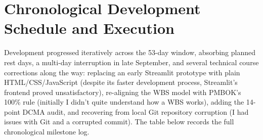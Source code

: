 \section{Chronological Development Schedule and Execution}
Development progressed iteratively across the 53-day window, absorbing planned rest days, a multi-day interruption in late September, and several technical course corrections along the way: replacing an early Streamlit prototype with plain HTML/CSS/JavaScript (despite its faster development process, Streamlit's frontend proved unsatisfactory), re-aligning the WBS model with PMBOK's 100\% rule (initially I didn't quite understand how a WBS works), adding the 14-point DCMA audit, and recovering from local Git repository corruption (I had issues with Git and a corrupted commit). The table below records the full chronological milestone log.


